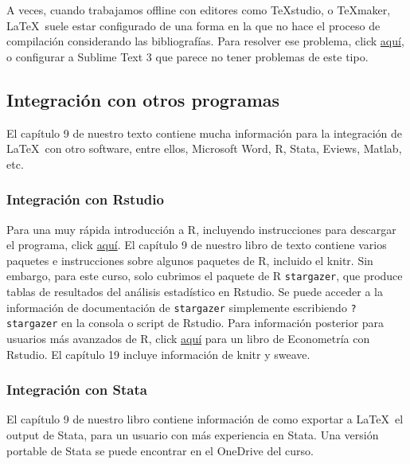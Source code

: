 \documentclass[a4paper]{article}
\begin{document}
A veces, cuando trabajamos offline con editores como \TeX studio, o \TeX maker, \LaTeX\ suele estar configurado de una forma en la que no hace el proceso de compilación considerando las bibliografías. Para resolver ese problema, click \href{https://tex.stackexchange.com/questions/135102/biblatex-doesnt-show-bibliography-when-compiling}{aquí}, o configurar a Sublime Text 3 que parece no tener problemas de este tipo. 
\subsection{Integración con otros programas}
El capítulo 9 de nuestro texto contiene mucha información para la integración de \LaTeX \ con otro software, entre ellos, Microsoft Word, R, Stata, Eviews, Matlab, etc. 
\subsubsection{Integración con Rstudio}
Para una muy rápida introducción a R, incluyendo instrucciones para descargar el programa, click \href{https://www.computerworld.com/article/2497143/business-intelligence-beginner-s-guide-to-r-introduction.html}{aquí}. El capítulo 9 de nuestro libro de texto contiene varios paquetes e instrucciones sobre algunos paquetes de R, incluido el \textsf{knitr}. Sin embargo, para este curso, solo cubrimos el paquete de R \texttt{stargazer}, que produce tablas de resultados del análisis estadístico en Rstudio. Se puede acceder a la información de documentación de \texttt{stargazer} simplemente escribiendo \texttt{?stargazer} en la consola o script de Rstudio. Para información posterior para usuarios más avanzados de R, click \href{http://www.urfie.net/read/index.html}{aquí} para un libro de Econometría con Rstudio. El capítulo 19 incluye información de \textsf{knitr} y \textsf{sweave}. 
\subsubsection{Integración con Stata}
El capítulo 9 de nuestro libro contiene información de como exportar a \LaTeX\ el output de Stata, para un usuario con más experiencia en Stata. Una versión portable de Stata se puede encontrar en el OneDrive del curso. 
\end{document}

